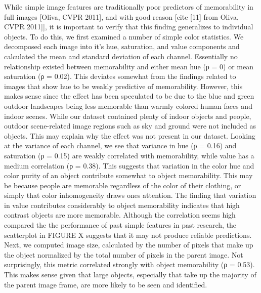 While simple image features are traditionally poor predictors of memorability in full images [Oliva, CVPR 2011], and with good reason [cite [11] from Oliva, CVPR 2011]], it is important to verify that this finding generalizes to individual objects. To do this, we first examined a number of simple color statistics. We decomposed each image into it's hue, saturation, and value components and calculated the mean and standard deviation of each channel. Essentially no relationship existed between memorability and either mean hue (ρ = 0) or mean saturation (ρ = 0.02). This deviates somewhat from the findings related to images that show hue to be weakly predictive of memorability. However, this makes sense since the effect has been speculated to be due to the blue and green outdoor landscapes being less memorable than warmly colored human faces and indoor scenes. While our dataset contained plenty of indoor objects and people, outdoor scene-related image regions such as sky and ground were not included as objects. This may explain why the effect was not present in our dataset. Looking at the variance of each channel, we see that variance in hue (ρ = 0.16) and saturation (ρ = 0.15) are weakly correlated with memorability, while value has a medium correlation (ρ = 0.38). This suggests that variation in the color hue and color purity of an object contribute somewhat to object memorability. This may be because people are memorable regardless of the color of their clothing, or simply that color inhomogeneity draws ones attention. The finding that variation in value contributes considerably to object memorability indicates that high contrast objects are more memorable. Although the correlation seems high compared the the performance of past simple features in past research, the scatterplot in FIGURE X suggests that it may not produce reliable predictions. Next, we computed image size, calculated by the number of pixels that make up the object normalized by the total number of pixels in the parent image. Not surprisingly, this metric correlated strongly with object memorability (ρ = 0.53). This makes sense given that large objects, especially that take up the majority of the parent image frame, are more likely to be seen and identified. 